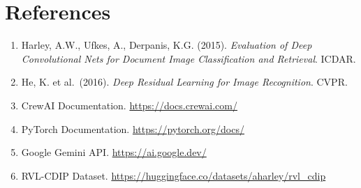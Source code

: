 \documentclass[12pt,a4paper]{article}
\begin{document}
\section*{References}
\begin{enumerate}
    \item Harley, A.W., Ufkes, A., Derpanis, K.G. (2015). \textit{Evaluation of Deep Convolutional Nets for Document Image Classification and Retrieval}. ICDAR.
    \item He, K. et al.\ (2016). \textit{Deep Residual Learning for Image Recognition}. CVPR.
    \item CrewAI Documentation. \url{https://docs.crewai.com/}
    \item PyTorch Documentation. \url{https://pytorch.org/docs/}
    \item Google Gemini API. \url{https://ai.google.dev/}
    \item RVL-CDIP Dataset. \url{https://huggingface.co/datasets/aharley/rvl_cdip}
\end{enumerate}
\end{document}
